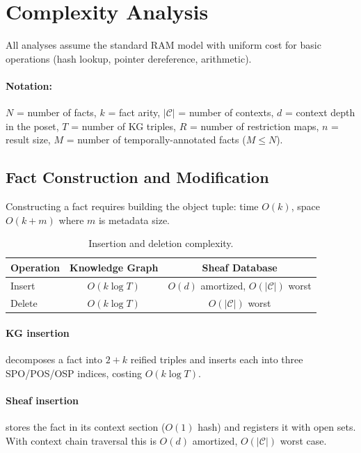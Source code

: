 \section{Complexity Analysis}
\label{sec:complexity}

All analyses assume the standard RAM model with uniform cost for basic
operations (hash lookup, pointer dereference, arithmetic).

\paragraph{Notation:}
$N$ = number of facts,
$k$ = fact arity,
$|\mathcal{C}|$ = number of contexts,
$d$ = context depth in the poset,
$T$ = number of KG triples,
$R$ = number of restriction maps,
$n$ = result size,
$M$ = number of temporally-annotated facts ($M \leq N$).

\subsection{Fact Construction and Modification}
\label{sec:complexity:modification}

Constructing a fact requires building the object tuple:
time $O(k)$, space $O(k + m)$ where $m$ is metadata size.

\begin{table}[ht]
\centering
\caption{Insertion and deletion complexity.}
\label{tab:complexity:modification}
\begin{tabular}{@{}lcc@{}}
\toprule
Operation & Knowledge Graph & Sheaf Database \\
\midrule
Insert & $O(k \log T)$ & $O(d)$ amortized, $O(|\mathcal{C}|)$ worst \\
Delete & $O(k \log T)$ & $O(|\mathcal{C}|)$ worst \\
\bottomrule
\end{tabular}
\end{table}

\paragraph{KG insertion} decomposes a fact into $2+k$ reified triples and
inserts each into three SPO/POS/OSP indices, costing $O(k \log T)$.

\paragraph{Sheaf insertion} stores the fact in its context section ($O(1)$ hash)
and registers it with open sets. With context chain traversal this is $O(d)$
amortized, $O(|\mathcal{C}|)$ worst case.

